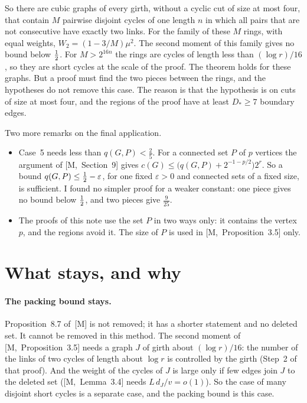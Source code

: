 \documentclass[11pt]{article}
\newcommand{\M}[1]{[M,~#1]}
\begin{document}
So there are cubic graphs of every girth, without a cyclic cut of size at most four, that contain
$M$ pairwise disjoint cycles of one length $n$ in which all pairs that are not consecutive have
exactly two links. For the family of these $M$ rings, with equal weights, $W_2=(1-3/M)\mu^{2}$.
The second moment of this family gives no bound below $\tfrac12$. For $M>2^{16n}$ the rings are
cycles of length less than $(\log r)/16$, so they are short cycles at the scale of the proof. The
theorem holds for these graphs. But a proof must find the two pieces between the rings, and the
hypotheses do not remove this case. The reason is that the hypothesis is on cuts of size at most
four, and the regions of the proof have at least $D_*\ge7$ boundary edges.

Two more remarks on the final application.
\begin{itemize}[leftmargin=1.2em]
\item Case~5 needs less than $q(G,P)<\frac25$. For a connected set $P$ of $p$ vertices the
argument of \M{Section~9} gives $c(G)\le\bigl(q(G,P)+2^{-1-p/2}\bigr)2^{r}$. So a bound
$q(G,P)\le\tfrac12-\varepsilon$, for one fixed $\varepsilon>0$ and connected sets of a fixed size, is
sufficient. I found no simpler proof for a weaker constant: one piece gives no bound below
$\tfrac12$, and two pieces give $\frac9{25}$.
\item The proofs of this note use the set $P$ in two ways only: it contains the vertex $p$, and
the regions avoid it. The size of $P$ is used in \M{Proposition~3.5} only.
\end{itemize}

\section{What stays, and why}\label{sec:stays}

\paragraph{The packing bound stays.} Proposition~8.7 of~[M] is not removed; it has a shorter
statement and no deleted set. It cannot be removed in this method. The second moment of
\M{Proposition~3.5} needs a graph $J$ of girth about $(\log r)/16$: the number of the links of two
cycles of length about $\log r$ is controlled by the girth (Step~2 of that proof). And the weight
of the cycles of $J$ is large only if few edges join $J$ to the deleted set (\M{Lemma~3.4} needs
$L\,d_J/v=o(1)$). So the case of many disjoint short cycles is a separate case, and the packing
bound is this case.
\end{document}
